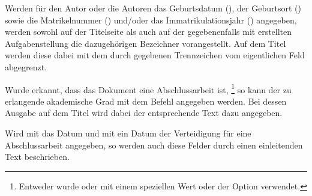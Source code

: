 \begin{Declaration}{}
\begin{Declaration}{}
\begin{Declaration}{}
\begin{Declaration}{}
\printdeclarationlist%
%
%
Werden für den Autor oder die Autoren das Geburtsdatum (), 
der Geburtsort () sowie die
Matrikelnummer () und/oder das Immatrikulationsjahr 
() angegeben, werden sowohl auf der Titelseite als 
auch auf der gegebenenfalls mit  erstellten 
Aufgabenstellung die dazugehörigen Bezeichner vorangestellt. Auf dem Titel 
werden diese dabei mit dem durch  gegebenen Trennzeichen 
vom eigentlichen Feld abgegrenzt.
\end{Declaration}
\end{Declaration}
\end{Declaration}
\end{Declaration}

\begin{Declaration}[v2.02]{}
\printdeclarationlist%
%
%
Wurde erkannt, dass das Dokument eine Abschlussarbeit ist,%
\footnote{%
  Entweder wurde  oder  mit einem speziellen Wert 
  oder der Option  verwendet.
}
so kann der zu erlangende akademische Grad mit dem Befehl  
angegeben werden. Bei dessen Ausgabe auf dem Titel wird dabei der entsprechende 
Text dazu angegeben.
\end{Declaration}

\begin{Declaration}{}
\begin{Declaration}{}
\printdeclarationlist%
%
%
%
Wird mit  das Datum und mit  ein Datum der 
Verteidigung für eine Abschlussarbeit angegeben, so werden auch diese Felder 
durch einen einleitenden Text beschrieben.
\end{Declaration}
\end{Declaration}

